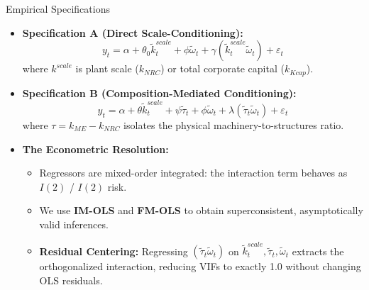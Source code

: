 \documentclass[10pt]{beamer}
\begin{document}
\begin{frame}{Empirical Specifications}
  \begin{itemize}
    \item \textbf{Specification A (Direct Scale-Conditioning):}
      $$y_t = \alpha + \theta_0 \tilde{k}^{scale}_t + \phi \tilde{\omega}_t + \gamma (\tilde{k}^{scale}_t \tilde{\omega}_t) + \varepsilon_t$$
      where $k^{scale}$ is plant scale ($k_{NRC}$) or total corporate capital ($k_{Kcap}$).
    \item \textbf{Specification B (Composition-Mediated Conditioning):}
      $$y_t = \alpha + \theta \tilde{k}^{scale}_t + \psi \tilde{\tau}_t + \phi \tilde{\omega}_t + \lambda (\tilde{\tau}_t \tilde{\omega}_t) + \varepsilon_t$$
      where $\tau = k_{ME} - k_{NRC}$ isolates the physical machinery-to-structures ratio.
    \item \textbf{The Econometric Resolution:}
      \begin{itemize}
        \item Regressors are mixed-order integrated: the interaction term behaves as $I(2)$ / $I(2)$ risk.
        \item We use \textbf{IM-OLS} and \textbf{FM-OLS} to obtain superconsistent, asymptotically valid inferences.
        \item \textbf{Residual Centering:} Regressing $(\tilde{\tau}_t \tilde{\omega}_t)$ on $\tilde{k}^{scale}_t, \tilde{\tau}_t, \tilde{\omega}_t$ extracts the orthogonalized interaction, reducing VIFs to exactly 1.0 without changing OLS residuals.
      \end{itemize}
  \end{itemize}
\end{frame}
\end{document}
